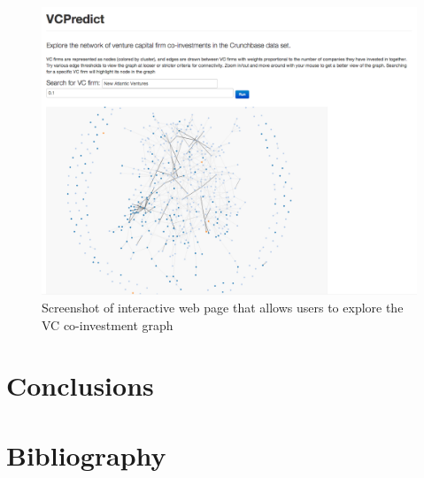 \documentclass{article}
\begin{document}
\begin{figure}[ht]
\vskip 0.2in
\begin{center}
\centerline{\includegraphics[width=\columnwidth]{vcpredict-web.png}}
\caption{Screenshot of interactive web page that allows users to explore the VC co-investment graph}
\label{Co-investment graph}
\end{center}
\vskip -0.2in
\end{figure}

\section{Conclusions}

\section{Bibliography}
\end{document}
